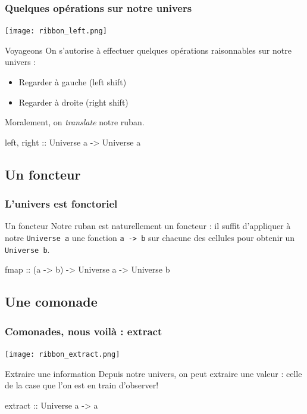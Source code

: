 \documentclass{beamer}
\begin{document}
\begin{frame}
\frametitle{Quelques opérations sur notre univers}

\begin{center}
\texttt{[image: ribbon\_left.png]}
\end{center}
\begin{block}{Voyageons}
On s'autorise à effectuer quelques opérations raisonnables sur notre univers :
\begin{itemize}
\item Regarder à gauche (left shift)
\item Regarder à droite (right shift)
\end{itemize}
\end{block}
\pause
\begin{block}{}
Moralement, on \emph{translate} notre ruban.
\end{block}
\pause
\begin{block}{}
left, right :: Universe a -> Universe a
\end{block}
\end{frame}

\subsection{Un foncteur}
\begin{frame}
\frametitle{L'univers est fonctoriel}
\begin{block}{Un foncteur}
Notre ruban est naturellement un foncteur : il suffit d'appliquer à notre \verb!Universe a! une fonction \verb!a -> b! sur chacune des cellules pour obtenir un \verb!Universe b!.
\end{block}
\begin{block}{}
fmap :: (a -> b) -> Universe a -> Universe b
\end{block}
\end{frame}

\subsection{Une comonade}
\begin{frame}
\frametitle{Comonades, nous voilà : extract}

\begin{center}
\texttt{[image: ribbon\_extract.png]}
\end{center}
\begin{block}{Extraire une information}
Depuis notre univers, on peut extraire une valeur : celle de la case que l'on est en train d'observer!

\end{block}
\begin{block}{}
extract :: Universe a -> a
\end{block}
\end{frame}
\end{document}
